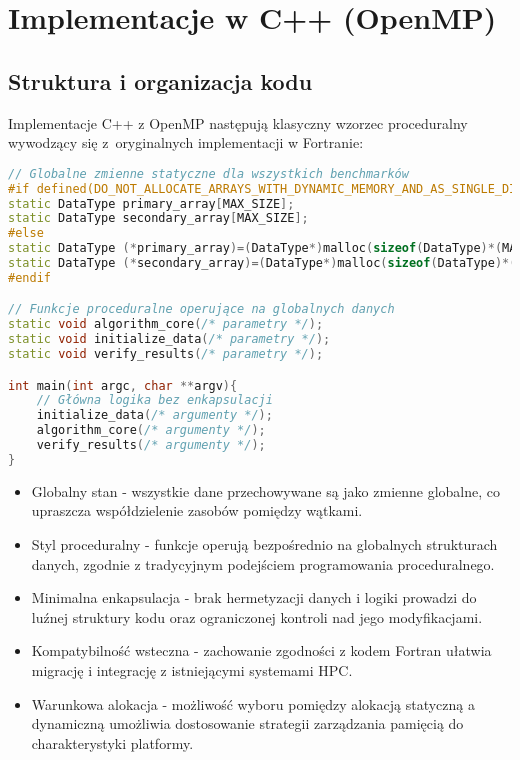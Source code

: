 \section{Implementacje w C++ (OpenMP)}
\subsection{Struktura i organizacja kodu}
Implementacje C++ z OpenMP następują klasyczny wzorzec proceduralny wywodzący się z~oryginalnych implementacji w Fortranie:

\begin{lstlisting}[language=C++, caption={Struktura kodu benchmarków w języku C++ z OpenMP}, label={lst:openmp_structure}]
// Globalne zmienne statyczne dla wszystkich benchmarków
#if defined(DO_NOT_ALLOCATE_ARRAYS_WITH_DYNAMIC_MEMORY_AND_AS_SINGLE_DIMENSION)
static DataType primary_array[MAX_SIZE];
static DataType secondary_array[MAX_SIZE];
#else
static DataType (*primary_array)=(DataType*)malloc(sizeof(DataType)*(MAX_SIZE));
static DataType (*secondary_array)=(DataType*)malloc(sizeof(DataType)*(MAX_SIZE));
#endif

// Funkcje proceduralne operujące na globalnych danych
static void algorithm_core(/* parametry */);
static void initialize_data(/* parametry */);
static void verify_results(/* parametry */);

int main(int argc, char **argv){
    // Główna logika bez enkapsulacji
    initialize_data(/* argumenty */);
    algorithm_core(/* argumenty */);
    verify_results(/* argumenty */);
}
\end{lstlisting}
\begin{itemize}
    \item Globalny stan - wszystkie dane przechowywane są jako zmienne globalne, co upraszcza współdzielenie zasobów pomiędzy wątkami.
    
    \item Styl proceduralny - funkcje operują bezpośrednio na globalnych strukturach danych, zgodnie z tradycyjnym podejściem programowania proceduralnego.
    
    \item Minimalna enkapsulacja - brak hermetyzacji danych i logiki prowadzi do luźnej struktury kodu oraz ograniczonej kontroli nad jego modyfikacjami.
    
    \item Kompatybilność wsteczna - zachowanie zgodności z kodem Fortran ułatwia migrację i integrację z istniejącymi systemami HPC.
    
    \item Warunkowa alokacja - możliwość wyboru pomiędzy alokacją statyczną a dynamiczną umożliwia dostosowanie strategii zarządzania pamięcią do charakterystyki platformy.
\end{itemize}
  
